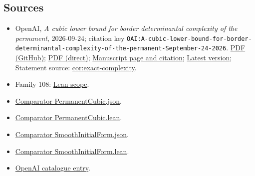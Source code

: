 \documentclass[11pt]{article}
\begin{document}
\subsection{Sources}
\begin{itemize}
\item OpenAI, \emph{A cubic lower bound for border determinantal complexity of the permanent}, 2026-09-24; citation key \texttt{OAI:A-cubic-lower-bound-for-border-determinantal-complexity-of-the-permanent-September-24-2026}. \href{https://github.com/openai/math/blob/adc7f1241b42e322a6451854ab7e4b4c146bf78a/preprints/A-cubic-lower-bound-for-border-determinantal-complexity-of-the-permanent-September-24-2026/A-cubic-lower-bound-for-border-determinantal-complexity-of-the-permanent-September-24-2026.pdf}{PDF (GitHub)}; \href{https://github.com/openai/math/raw/adc7f1241b42e322a6451854ab7e4b4c146bf78a/preprints/A-cubic-lower-bound-for-border-determinantal-complexity-of-the-permanent-September-24-2026/A-cubic-lower-bound-for-border-determinantal-complexity-of-the-permanent-September-24-2026.pdf}{PDF (direct)}; \href{https://github.com/openai/math/blob/adc7f1241b42e322a6451854ab7e4b4c146bf78a/preprints/A-cubic-lower-bound-for-border-determinantal-complexity-of-the-permanent-September-24-2026/README.md}{Manuscript page and citation}; \href{https://github.com/openai/math/blob/main/preprints/A-cubic-lower-bound-for-border-determinantal-complexity-of-the-permanent-September-24-2026/A-cubic-lower-bound-for-border-determinantal-complexity-of-the-permanent-September-24-2026.pdf}{Latest version}; Statement source: \href{https://github.com/openai/math/blob/adc7f1241b42e322a6451854ab7e4b4c146bf78a/preprints/A-cubic-lower-bound-for-border-determinantal-complexity-of-the-permanent-September-24-2026/build/source/sections/consequences.tex\#L47}{cor:exact-complexity}.
\item Family 108: \href{https://github.com/openai/math/blob/adc7f1241b42e322a6451854ab7e4b4c146bf78a/lean/docs/108.md}{Lean scope}.
\item \href{https://github.com/openai/math/blob/adc7f1241b42e322a6451854ab7e4b4c146bf78a/lean/ComparatorChallenges/PermanentCubic.json}{Comparator PermanentCubic.json}.
\item \href{https://github.com/openai/math/blob/adc7f1241b42e322a6451854ab7e4b4c146bf78a/lean/ComparatorChallenges/PermanentCubic.lean}{Comparator PermanentCubic.lean}.
\item \href{https://github.com/openai/math/blob/adc7f1241b42e322a6451854ab7e4b4c146bf78a/lean/ComparatorChallenges/SmoothInitialForm.json}{Comparator SmoothInitialForm.json}.
\item \href{https://github.com/openai/math/blob/adc7f1241b42e322a6451854ab7e4b4c146bf78a/lean/ComparatorChallenges/SmoothInitialForm.lean}{Comparator SmoothInitialForm.lean}.
\item \href{https://github.com/openai/math/blob/adc7f1241b42e322a6451854ab7e4b4c146bf78a/CONTENTS.md}{OpenAI catalogue entry}.
\end{itemize}
\end{document}
